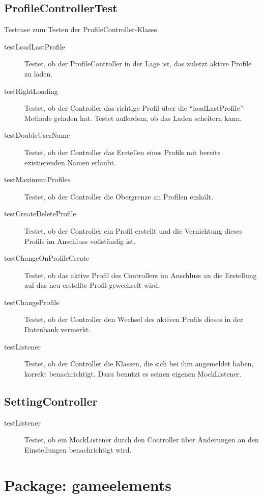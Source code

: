 \documentclass[parskip=full]{scrreprt}
\begin{document}
\subsection{ProfileControllerTest}

Testcase zum Testen der ProfileController-Klasse.

\begin{description}
	\item[testLoadLastProfile] Testet, ob der ProfileController in der Lage ist, das zuletzt aktive Profile zu laden.
	\item[testRightLoading] Testet, ob der Controller das richtige Profil über die \enquote{loadLastProfile}-Methode geladen hat. Testet außerdem, ob das Laden scheitern kann.
	\item[testDoubleUserName] Testet, ob der Controller das Erstellen eines Profils mit bereits existierenden Namen erlaubt.
	\item[testMaximumProfiles] Testet, ob der Controller die Obergrenze an Profilen einhält.
	\item[testCreateDeleteProfile] Testet, ob der Controller ein Profil erstellt und die Vernichtung dieses Profils im Anschluss vollständig ist.
	\item[testChangeOnProfileCreate] Testet, ob das aktive Profil des Controllers im Anschluss an die Erstellung auf das neu erstellte Profil gewechselt wird.
	\item[testChangeProfile] Testet, ob der Controller den Wechsel des aktiven Profils dieses in der Datenbank vermerkt.
	\item[testListener] Testet, ob der Controller die Klassen, die sich bei ihm angemeldet haben, korrekt benachrichtigt. Dazu benutzt es seinen eigenen MockListener.
\end{description}

\subsection{SettingController}

\begin{description}
	\item [testListener] Testet, ob ein MockListener durch den Controller über Änderungen an den Einstellungen benachrichtigt wird.
\end{description}

\section{Package: gameelements}
\end{document}
